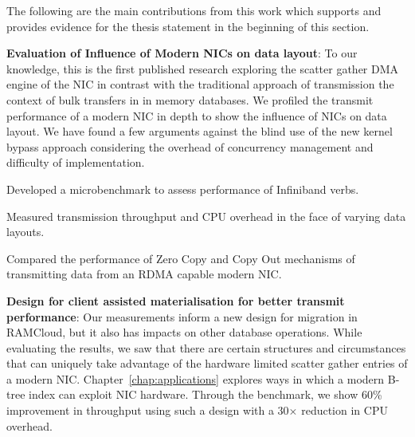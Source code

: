 The following are the main contributions from this work which supports and provides
evidence for the thesis statement in the beginning of this section.

\begin{myitemize}

  \item{\textbf{Evaluation of Influence of Modern NICs on data layout}}: To our knowledge,
   this is the first published research exploring the scatter gather DMA engine of the NIC 
   in contrast with the traditional approach of transmission the context of bulk transfers in in memory databases. 
   We profiled the transmit performance of a modern NIC in depth to show the influence of NICs on data layout. 
   We have found a few arguments against the blind use of the new kernel bypass approach considering
   the overhead of concurrency management and difficulty of implementation.
   \begin{myitemize}

    \item Developed a microbenchmark to assess performance of Infiniband verbs.

    \item Measured transmission throughput and CPU overhead in the face of varying
    data layouts.

    \item Compared the performance of Zero Copy and Copy Out mechanisms of \linebreak
    transmitting data from an RDMA capable modern NIC.
   \end{myitemize} 

    \item{\textbf{Design for client assisted materialisation for better transmit performance}}: Our measurements inform a new design for migration in RAMCloud, but it also has impacts on other database operations.
     While evaluating the results, we saw that there are certain structures and circumstances that can uniquely take advantage of the hardware limited scatter gather entries of a modern NIC.
     Chapter~\ref{chap:applications} explores ways in which a modern B-tree index can exploit NIC hardware.
     Through the benchmark, we show 60\% improvement in throughput using such a design with a 30$\times$ reduction in CPU overhead.



\end{myitemize}
